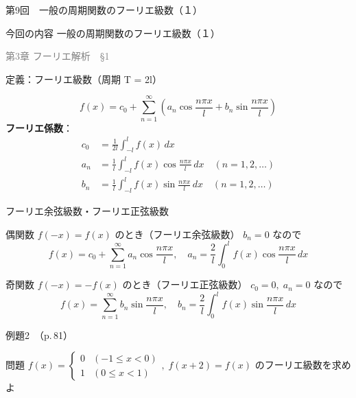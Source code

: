 \documentclass[professionalfonts]{beamer}
\begin{document}
\begin{frame}{第9回　一般の周期関数のフーリエ級数（１）}
  \begin{block}{今回の内容}
  一般の周期関数のフーリエ級数（１）
  \end{block}
  \vfill\hfill{\scriptsize \textcolor{gray}{第3章 フーリエ解析　§1}}
\end{frame}

\begin{frame}{定義：フーリエ級数（周期 T = 2l）}
  \begin{block}{}
  \[
    f(x) = c_{0} + \sum_{n=1}^\infty \left(a_{n}\cos\frac{n\pi x}{l} + b_{n}\sin\frac{n\pi x}{l}\right)
  \]
  \medskip\textbf{フーリエ係数}：
  \begin{align*}
    c_{0} &= \frac{1}{2l} \int_{-l}^{l} f(x)\,dx \\[4pt]
    a_{n} &= \frac{1}{l} \int_{-l}^{l} f(x)\cos\frac{n\pi x}{l}\,dx \quad(n=1,2,\ldots) \\[4pt]
    b_{n} &= \frac{1}{l} \int_{-l}^{l} f(x)\sin\frac{n\pi x}{l}\,dx \quad(n=1,2,\ldots)
  \end{align*}
  \end{block}
\end{frame}

\begin{frame}{フーリエ余弦級数・フーリエ正弦級数}
  \begin{block}{偶関数 $f(-x)=f(x)$ のとき（フーリエ余弦級数）}
    $b_{n}=0$ なので
    \[
      f(x) = c_{0} + \sum_{n=1}^{\infty} a_{n}\cos\frac{n\pi x}{l},\quad
      a_{n} = \frac{2}{l}\int_{0}^{l} f(x)\cos\frac{n\pi x}{l}\,dx
    \]
  \end{block}
  \begin{block}{奇関数 $f(-x)=-f(x)$ のとき（フーリエ正弦級数）}
    $c_{0}=0,\;a_{n}=0$ なので
    \[
      f(x) = \sum_{n=1}^{\infty} b_{n}\sin\frac{n\pi x}{l},\quad
      b_{n} = \frac{2}{l}\int_{0}^{l} f(x)\sin\frac{n\pi x}{l}\,dx
    \]
  \end{block}
\end{frame}

\begin{frame}{例題2　（p.\,81）}
  \begin{exampleblock}{問題}
    $f(x) = \begin{cases} 0 & (-1 \leq x < 0) \\ 1 & (0 \leq x < 1) \end{cases},\; f(x+2) = f(x)$ のフーリエ級数を求めよ\\[2pt]
  \end{exampleblock}
\end{frame}
\end{document}
